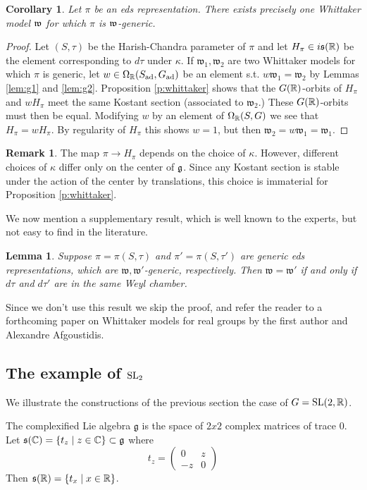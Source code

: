 \documentclass{article}
\newtheorem{lem}[thm]{Lemma}
\newtheorem{cor}[thm]{Corollary}
\theoremstyle{definition}
\newtheorem{rem}[thm]{Remark}
\numberwithin{equation}{section}
\renewcommand{\-}{\hyp{}}
\newcommand{\s}{\mathfrak s}
\newcommand{\g}{\mathfrak g}
\newcommand{\w}{\mathfrak w}
\newcommand{\SL}{\mathrm{SL}}
\begin{document}
\begin{cor}
	Let $\pi$ be an eds representation. There exists precisely one Whittaker model $\mathfrak{w}$ for which $\pi$ is $\mathfrak{w}$-generic.
\end{cor}
\begin{proof}
	Let $(S,\tau)$ be the Harish-Chandra parameter of $\pi$ and let $H_\pi \in i\mathfrak{s}(\mathbb{R})$ be the element corresponding to $d\tau$ under $\kappa$. If $\w_1,\w_2$ are two Whittaker models for which $\pi$ is generic, let $w \in \Omega_{\mathbb{R}}(S_{\textrm{ad}},G_{\textrm{ad}})$ be an element s.t. $w\w_1=\w_2$ by Lemmas \ref{lem:g1} and \ref{lem:g2}. Proposition \ref{p:whittaker} shows that the $G(\mathbb{R})$-orbits of $H_\pi$ and $wH_\pi$ meet the same Kostant section (associated to $\w_2$.) These $G(\mathbb{R})$-orbits must then be equal. Modifying $w$ by an element of $\Omega_{\mathbb{R}}(S,G)$ we see that $H_\pi=wH_\pi$. By regularity of $H_\pi$ this shows $w=1$, but then $\w_2=w\w_1=\w_1$.
\end{proof}


\begin{rem}
  The map $\pi\rightarrow H_\pi$ depends on the choice of $\kappa$. However, different choices of $\kappa$ differ only on the center of $\mathfrak{g}$. Since any Kostant section is stable under the action of the center by translations, this choice is immaterial for Proposition \ref{p:whittaker}.
\end{rem}

We now mention  a supplementary result, which is well known to the experts, but not easy to find in the literature.

\begin{lem} \label{lem:g2'}
    Suppose $\pi=\pi(S,\tau)$ and $\pi'=\pi(S,\tau')$ are generic eds representations, which are $\w, \w'$-generic, respectively.
    Then $\w=\w'$ if and only if $d\tau$ and $d\tau'$ are in the same Weyl chamber. 
\end{lem}

Since we don't use this result we skip the proof, and refer the reader to a forthcoming paper on Whittaker models for real groups
by the first author and Alexandre Afgoustidis.


\subsection{The example of $\textrm{SL}_2$}

We illustrate the constructions of the previous section the case of $G=\SL(2,\R)$. 

The complexified Lie algebra $\g$ is the space of $2x2$ complex matrices of trace $0$. Let $\s(\C)=\{t_z\mid z\in\C\}\subset \g$ where
$$
t_z=\begin{pmatrix}0&z\\-z&0
\end{pmatrix}
$$
Then $\s(\R)=\{t_x\mid x\in\R\}$.
\end{document}
